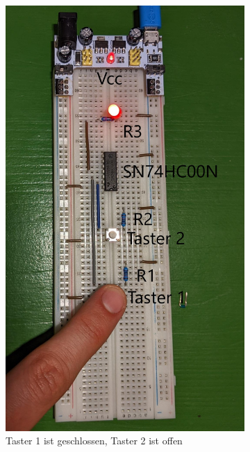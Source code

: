 \documentclass[
    paper=a4,
]{scrartcl}
\begin{document}
\begin{figure}
\begin{subfigure}[t]{0.3\textwidth}
            \includegraphics[width=0.9\linewidth]{Anhang/Bild2.2.jpg}
            \caption{Taster 1 ist geschlossen, Taster 2 ist offen}
        \end{subfigure}\hfill%
        \begin{subfigure}[t]{0.3\textwidth}
            \centering

\end{subfigure}
\end{figure}
\end{document}
